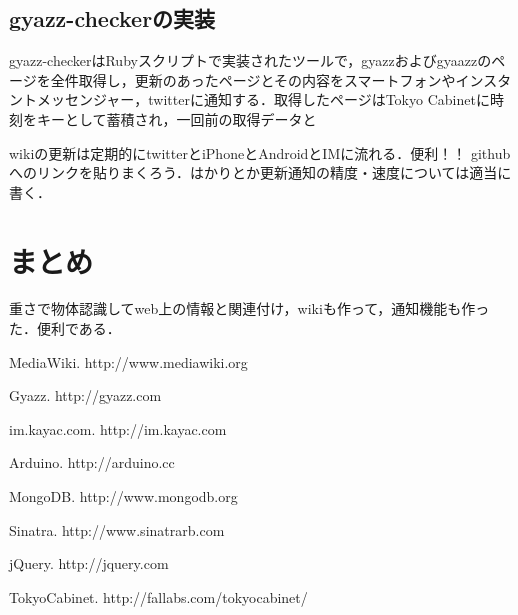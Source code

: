 \subsection{gyazz-checkerの実装}
gyazz-checkerはRubyスクリプトで実装されたツールで，gyazzおよびgyaazzのページを全件取得し，更新のあったページとその内容をスマートフォンやインスタントメッセンジャー，twitterに通知する．取得したページはTokyo Cabinetに時刻をキーとして蓄積され，一回前の取得データと

wikiの更新は定期的にtwitterとiPhoneとAndroidとIMに流れる．便利！！
githubへのリンクを貼りまくろう．はかりとか更新通知の精度・速度については適当に書く．


\section{まとめ}
重さで物体認識してweb上の情報と関連付け，wikiも作って，通知機能も作った．便利である．


\begin{thebibliography}{10}

MediaWiki. http://www.mediawiki.org

Gyazz. http://gyazz.com

im.kayac.com. http://im.kayac.com

Arduino. http://arduino.cc

MongoDB. http://www.mongodb.org

Sinatra. http://www.sinatrarb.com

jQuery. http://jquery.com

TokyoCabinet. http://fallabs.com/tokyocabinet/

\end{thebibliography}

